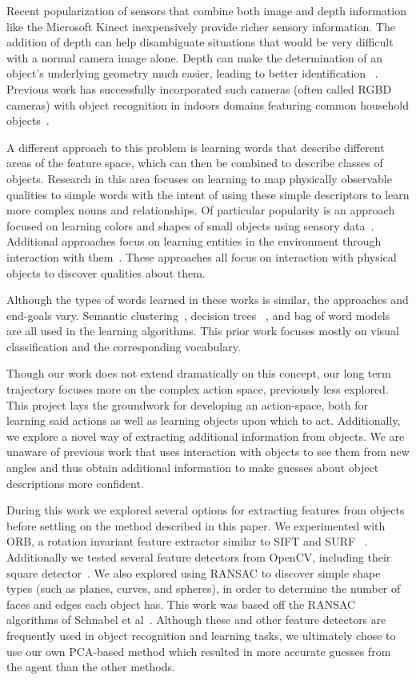 \documentclass[11pt]{article}
\begin{document}
Recent popularization of sensors that combine both image and depth information
like the Microsoft Kinect inexpensively provide richer sensory information. The
addition of depth can help disambiguate situations that would be very difficult
with a normal camera image alone. Depth can make the determination of an object’s
underlying geometry much easier, leading to better identification
~\cite{marton2010hierarchical}.
Previous work has successfully incorporated such cameras (often called RGBD
cameras) with object recognition in indoors domains featuring common household
objects~\cite{marton2010hierarchical, lai2011sparse}.

A different approach to this problem is learning words that describe different
areas of the feature space, which can then be combined to describe classes of
objects. Research in this area focuses on learning to map physically observable
qualities to simple words with the intent of using these simple descriptors to
learn more complex nouns and relationships. Of particular popularity is an
approach focused on learning colors and shapes of small objects using sensory
data~\cite{zambuto2010visually, roy2002learning}. Additional approaches focus on
learning entities in the environment through interaction with
them~\cite{gold2009robotic}. These approaches all focus on interaction with
physical objects to discover qualities about them.

Although the types of words learned in these works is similar, the approaches and
end-goals vary. Semantic clustering~\cite{zambuto2010visually}, decision trees
~\cite{gold2009robotic}, and bag of word models~\cite{roy2002learning} are all
used in the learning algorithms. This prior work focuses mostly on visual
classification and the corresponding vocabulary.

Though our work does not extend dramatically on this concept, our long term
trajectory focuses more on the complex action space, previously less explored.
This project lays the groundwork for developing an action-space, both for
learning said actions as well as learning objects upon which to act.
Additionally, we explore a novel way of extracting additional information from
objects. We are unaware of previous work that uses interaction with objects to
see them from new angles and thus obtain additional information to make guesses
about object descriptions more confident.

During this work we explored several options for extracting features from
objects before settling on the method described in this paper. We experimented
with ORB, a rotation invariant feature extractor similar to SIFT and SURF
~\cite{rublee2011orb}. Additionally we tested several feature detectors from
OpenCV, including their square detector~\cite{opencv_library}. We also explored
using RANSAC to discover simple shape types (such as planes, curves, and spheres),
in order to determine the number of faces and edges each object has. This work
was based off the RANSAC algorithms of Schnabel et
al~\cite{schnabel2007efficient}. Although these and other feature detectors are
frequently used in object recognition and learning tasks, we ultimately chose to
use our own PCA-based method which resulted in more accurate guesses from the
agent than the other methods.
\end{document}
